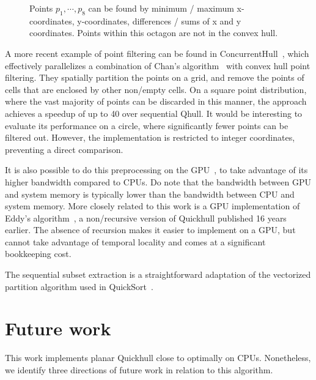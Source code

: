 \documentclass[11pt,a4paper]{article}
\begin{document}
\begin{figure}[t]
  \centering
  \caption{Points $p_1, \cdots, p_8$ can be found by minimum / maximum x-coordinates, y-coordinates, differences / sums of x and y coordinates.
  Points within this octagon are not in the convex hull.}%
  \label{fig:akl}%
\end{figure}

A more recent example of point filtering can be found in ConcurrentHull~\cite{masnadi2020concurrent}, which effectively parallelizes a combination of Chan's algorithm~\cite{chan1996optimal} with convex hull point filtering.
They spatially partition the points on a grid, and remove the points of cells that are enclosed by other non\-/empty cells.
On a square point distribution, where the vast majority of points can be discarded in this manner, the approach achieves a speedup of up to \qty{40}{\times} over sequential Qhull.
It would be interesting to evaluate its performance on a circle, where significantly fewer points can be filtered out.
However, the implementation is restricted to integer coordinates, preventing a direct comparison.

It is also possible to do this preprocessing on the GPU~\cite{mei2016cuda}, to take advantage of its higher bandwidth compared to CPUs.
Do note that the bandwidth between GPU and system memory is typically lower than the bandwidth between CPU and system memory.
More closely related to this work is a GPU implementation of Eddy's algorithm~\cite{eddy1977convex}, a non\-/recursive version of Quickhull published 16 years earlier.
The absence of recursion makes it easier to implement on a GPU, but cannot take advantage of temporal locality and comes at a significant bookkeeping cost.

The sequential subset extraction is a straightforward adaptation of the vectorized partition algorithm used in QuickSort~\cite{bramas2017novel}.

\section{Future work}
This work implements planar Quickhull close to optimally on CPUs.
Nonetheless, we identify three directions of future work in relation to this algorithm.
\end{document}

